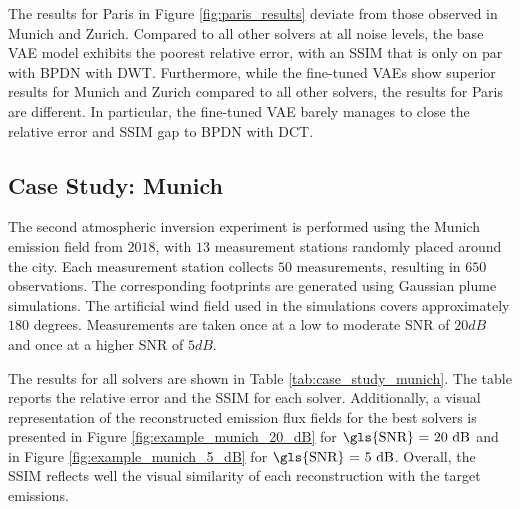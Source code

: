 The results for Paris in Figure \ref{fig:paris_results} deviate from those observed in Munich and Zurich.
Compared to all other solvers at all noise levels, the base \gls{VAE} model exhibits the poorest relative error, with an \gls{SSIM} that is only on par with \gls{BPDN} with \gls{DWT}.
Furthermore, while the fine-tuned \gls{VAE}s show superior results for Munich and Zurich compared to all other solvers, the results for Paris are different.
In particular, the fine-tuned \gls{VAE} barely manages to close the relative error and \gls{SSIM} gap to \gls{BPDN} with \gls{DCT}.

\subsection{Case Study: Munich}
The second atmospheric inversion experiment is performed using the Munich emission field from $2018$, with $13$ measurement stations randomly placed around the city.
Each measurement station collects $50$ measurements, resulting in $650$ observations.
The corresponding footprints are generated using Gaussian plume simulations.
The artificial wind field used in the simulations covers approximately $180$ degrees.
Measurements are taken once at a low to moderate \gls{SNR} of $20 \unit{dB}$ and once at a higher \gls{SNR} of $5 \unit{dB}$.

The results for all solvers are shown in Table \ref{tab:case_study_munich}.
The table reports the relative error and the \gls{SSIM} for each solver.
Additionally, a visual representation of the reconstructed emission flux fields for the best solvers is presented in Figure \ref{fig:example_munich_20_dB} for $\text{\gls{SNR} = 20 \unit{dB}}$ and in Figure \ref{fig:example_munich_5_dB} for $\text{\gls{SNR} = 5 \unit{dB}}$.
Overall, the \gls{SSIM} reflects well the visual similarity of each reconstruction with the target emissions.

